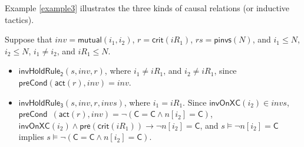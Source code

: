 \documentclass[final]{IEEEtran}
\def \eqc {=}
\def \andc {\wedge }
\def \negc {\lnot}
\begin{document}
{Example \ref{example3} illustrates the three kinds of causal relations (or inductive tactics).

\begin{example}\label{example3} Suppose that $inv=\mathsf{mutual} (i_1,i_2)$, $r=\mathsf{crit}(iR_1)$, $rs= \mathsf{pinvs} (N)$, and     $i_1 \leq N$, $i_2 \leq N$, $i_1 \neq i_2$, and $iR_1 \leq N$.

\begin{itemize}




\item     $\mathsf{invHoldRule_2 }(s,inv,r)$, where   $i_1 \neq iR_1$, and $i_2 \neq iR_1$, since $\mathsf{preCond}(\mathsf{act}(r),inv)=inv$.


 \item   $\mathsf{invHoldRule_3 }(s,inv,r,invs)$, where  $i_1 = iR_1$.
  Since
 $\mathsf{invOnXC}( i_2) \in invs$, $\mathsf{preCond}$\ $(\mathsf{act}(r),inv)=\negc (\mathsf{C}\eqc\mathsf{C}\andc n[i_2]\eqc\mathsf{C})$,  $\mathsf{invOnXC}( i_2) \andc \mathsf{pre}(\mathsf{crit}(iR_1)) \longrightarrow \negc n[i_2]\eqc\mathsf{C}$, and $s \models \neg n[i_2]\eqc\mathsf{C}$  implies  $s \models \negc (\mathsf{C}\eqc\mathsf{C}\andc n[i_2]\eqc\mathsf{C})$.



\end{itemize}
\end{example}}
\end{document}

